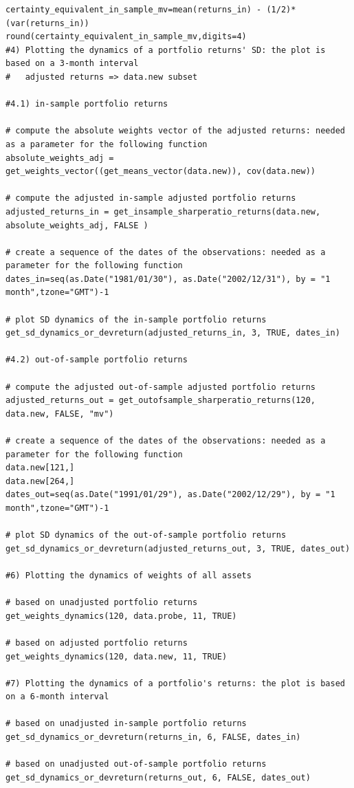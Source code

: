\documentclass{article}
\begin{document}
\begin{lstlisting}[caption={This listing shows the entire code developed in R.}, label=code:1,frame=single]
certainty_equivalent_in_sample_mv=mean(returns_in) - (1/2)*(var(returns_in))
round(certainty_equivalent_in_sample_mv,digits=4)
#4) Plotting the dynamics of a portfolio returns' SD: the plot is based on a 3-month interval 
#   adjusted returns => data.new subset

#4.1) in-sample portfolio returns

# compute the absolute weights vector of the adjusted returns: needed as a parameter for the following function
absolute_weights_adj = get_weights_vector((get_means_vector(data.new)), cov(data.new))

# compute the adjusted in-sample adjusted portfolio returns 
adjusted_returns_in = get_insample_sharperatio_returns(data.new, absolute_weights_adj, FALSE )

# create a sequence of the dates of the observations: needed as a parameter for the following function
dates_in=seq(as.Date("1981/01/30"), as.Date("2002/12/31"), by = "1 month",tzone="GMT")-1

# plot SD dynamics of the in-sample portfolio returns
get_sd_dynamics_or_devreturn(adjusted_returns_in, 3, TRUE, dates_in)

#4.2) out-of-sample portfolio returns

# compute the adjusted out-of-sample adjusted portfolio returns
adjusted_returns_out = get_outofsample_sharperatio_returns(120, data.new, FALSE, "mv")

# create a sequence of the dates of the observations: needed as a parameter for the following function
data.new[121,]
data.new[264,]
dates_out=seq(as.Date("1991/01/29"), as.Date("2002/12/29"), by = "1 month",tzone="GMT")-1

# plot SD dynamics of the out-of-sample portfolio returns
get_sd_dynamics_or_devreturn(adjusted_returns_out, 3, TRUE, dates_out)

#6) Plotting the dynamics of weights of all assets

# based on unadjusted portfolio returns
get_weights_dynamics(120, data.probe, 11, TRUE)

# based on adjusted portfolio returns
get_weights_dynamics(120, data.new, 11, TRUE)

#7) Plotting the dynamics of a portfolio's returns: the plot is based on a 6-month interval

# based on unadjusted in-sample portfolio returns
get_sd_dynamics_or_devreturn(returns_in, 6, FALSE, dates_in)

# based on unadjusted out-of-sample portfolio returns
get_sd_dynamics_or_devreturn(returns_out, 6, FALSE, dates_out)


\end{lstlisting}
\end{document}
